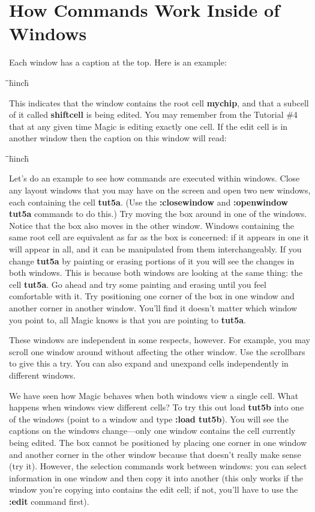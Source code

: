 \documentclass[letterpaper,twoside,12pt]{article}
\def\hinch{\hspace*{0.5in}}
\def\starti{\begin{center}\begin{tabbing}\hinch\=\hinch\=\hinch\=hinch\hinch\=\kill}
\def\endi{\end{tabbing}\end{center}}
\def\ii{\>\>\>}
\begin{document}
\section{How Commands Work Inside of Windows}

Each window has a caption at the top.   Here is an example:

\starti
   \ii {\bfseries mychip EDITING shiftcell}
\endi

This indicates that the window contains the root cell {\bfseries mychip}, and that
a subcell of it called {\bfseries shiftcell} is being edited.  You may 
remember from the Tutorial \#4 that at any given
time Magic is editing exactly one cell.
If the edit cell is in another window then the caption on
this window will read:

\starti
   \ii {\bfseries mychip [NOT BEING EDITED]}
\endi

Let's do an example to see how commands are executed within windows.
Close any layout windows that you may have on the screen and open two new
windows, each containing the cell {\bfseries tut5a}.  (Use the {\bfseries :closewindow}
and {\bfseries :openwindow tut5a} commands to do this.)
Try moving the box around in one of the windows.  Notice
that the box also moves in the other window.  
Windows containing the same root cell are equivalent as far as
the box is concerned: if it appears in one it will appear in all,
and it can be manipulated from them interchangeably.
If you change {\bfseries tut5a} by painting or erasing portions of it you will
see the changes in both windows.
This is because both
windows are looking at the same thing:  the cell {\bfseries tut5a}.
Go ahead and try some painting and erasing until you feel comfortable
with it.  Try positioning one corner of the box in one window and another
corner in another window.  You'll find it doesn't matter which window
you point to, all Magic knows is that you are pointing to {\bfseries tut5a}.

These windows are independent in some respects, however.  
For example, you may scroll one window around
without affecting the other window.  Use the scrollbars
to give this a try.  You can also expand and unexpand cells
independently in different windows.

We have seen how Magic behaves when both windows view a single cell.
What happens when windows view different cells?  To try this
out load {\bfseries tut5b} into one of the windows 
(point to a window and type {\bfseries :load tut5b}).
You will see the captions on the windows change---only one
window contains the cell currently being edited.  The box cannot
be positioned by placing one corner in one window and another corner
in the other window because that doesn't really make sense (try it).
However, the selection commands work between windows:  you can select
information in one window and then copy it into another (this
only works if the window
you're copying into contains the edit cell;  if not, you'll have
to use the {\bfseries :edit} command first).
\end{document}
